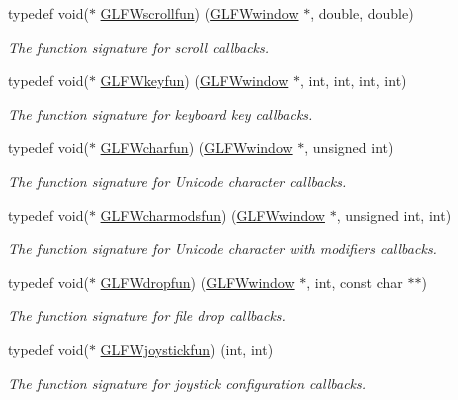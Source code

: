 \begin{DoxyCompactItemize}
typedef void($\ast$ \hyperlink{group__input_ga4687e2199c60a18a8dd1da532e6d75c9}{G\+L\+F\+Wscrollfun}) (\hyperlink{group__window_ga3c96d80d363e67d13a41b5d1821f3242}{G\+L\+F\+Wwindow} $\ast$, double, double)
\begin{DoxyCompactList}\small\item\em The function signature for scroll callbacks. \end{DoxyCompactList}\item 
typedef void($\ast$ \hyperlink{group__input_ga0192a232a41e4e82948217c8ba94fdfd}{G\+L\+F\+Wkeyfun}) (\hyperlink{group__window_ga3c96d80d363e67d13a41b5d1821f3242}{G\+L\+F\+Wwindow} $\ast$, int, int, int, int)
\begin{DoxyCompactList}\small\item\em The function signature for keyboard key callbacks. \end{DoxyCompactList}\item 
typedef void($\ast$ \hyperlink{group__input_gabf24451c7ceb1952bc02b17a0d5c3e5f}{G\+L\+F\+Wcharfun}) (\hyperlink{group__window_ga3c96d80d363e67d13a41b5d1821f3242}{G\+L\+F\+Wwindow} $\ast$, unsigned int)
\begin{DoxyCompactList}\small\item\em The function signature for Unicode character callbacks. \end{DoxyCompactList}\item 
typedef void($\ast$ \hyperlink{group__input_gae36fb6897d2b7df9b128900c8ce9c507}{G\+L\+F\+Wcharmodsfun}) (\hyperlink{group__window_ga3c96d80d363e67d13a41b5d1821f3242}{G\+L\+F\+Wwindow} $\ast$, unsigned int, int)
\begin{DoxyCompactList}\small\item\em The function signature for Unicode character with modifiers callbacks. \end{DoxyCompactList}\item 
typedef void($\ast$ \hyperlink{group__input_gab71f4ca80b651462852e601caf308c4a}{G\+L\+F\+Wdropfun}) (\hyperlink{group__window_ga3c96d80d363e67d13a41b5d1821f3242}{G\+L\+F\+Wwindow} $\ast$, int, const char $\ast$$\ast$)
\begin{DoxyCompactList}\small\item\em The function signature for file drop callbacks. \end{DoxyCompactList}\item 
typedef void($\ast$ \hyperlink{group__input_gaa67aa597e974298c748bfe4fb17d406d}{G\+L\+F\+Wjoystickfun}) (int, int)
\begin{DoxyCompactList}\small\item\em The function signature for joystick configuration callbacks. \end{DoxyCompactList}\end{DoxyCompactItemize}
